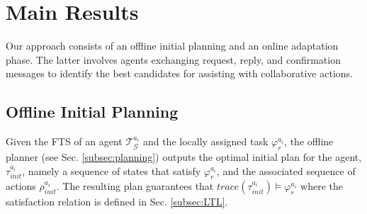 
\section{Main Results}\label{sec:results}
Our approach consists of an offline initial planning and an online adaptation phase. The latter involves agents exchanging request, reply, and confirmation messages to identify the best candidates for assisting with collaborative actions.
\subsection{Offline Initial Planning}\label{subsec:res-planning}
Given the FTS of an agent $\mathcal{T}_{\mathcal{G}}^{a_{i}}$ and the locally assigned task $\varphi^{a_{i}}_r$, the offline planner (see Sec. \ref{subsec:planning}) outputs the optimal initial plan for the agent, $\tau^{a_i}_{init}$, namely a sequence of states that satisfy $\varphi^{a_i}_r$, and the associated sequence of actions $\rho^{a_i}_{init}$. The resulting plan guarantees that $\mathit{trace}\left(\tau^{a_{i}}_{init}\right) \models \varphi^{a_{i}}_r$ where the satisfaction relation is defined in Sec. \ref{subsec:LTL}.

